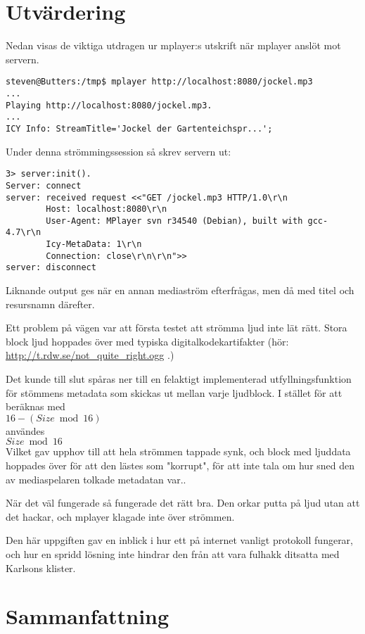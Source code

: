 \documentclass[a4paper, 11pt]{article}
\begin{document}
\section{Utvärdering}


Nedan visas de viktiga utdragen ur mplayer:s utskrift när mplayer anslöt mot servern.
\begin{verbatim}
steven@Butters:/tmp$ mplayer http://localhost:8080/jockel.mp3
...
Playing http://localhost:8080/jockel.mp3.
...
ICY Info: StreamTitle='Jockel der Gartenteichspr...';
\end{verbatim}

Under denna strömmingssession så skrev servern ut:
\begin{verbatim}
3> server:init().
Server: connect
server: received request <<"GET /jockel.mp3 HTTP/1.0\r\n
        Host: localhost:8080\r\n
        User-Agent: MPlayer svn r34540 (Debian), built with gcc-4.7\r\n
        Icy-MetaData: 1\r\n
        Connection: close\r\n\r\n">>
server: disconnect
\end{verbatim}

Liknande output ges när en annan mediaström efterfrågas, men då med titel och resursnamn därefter. 

Ett problem på vägen var att första testet att strömma ljud inte lät rätt. Stora block ljud hoppades över med typiska digitalkodekartifakter (hör: \url{http://t.rdw.se/not_quite_right.ogg} .)

Det kunde till slut spåras ner till en felaktigt implementerad utfyllningsfunktion för stömmens metadata som skickas ut mellan varje ljudblock. I stället för att beräknas med\\
$16 - (Size \bmod{16})$\\
användes \\
$Size \bmod{16}$\\
Vilket gav upphov till att hela strömmen tappade synk, och block med ljuddata hoppades över för att den lästes som "korrupt", för att inte tala om
hur sned den av mediaspelaren tolkade metadatan var..

När det väl fungerade så fungerade det rätt bra. Den orkar putta på ljud utan att det hackar, och mplayer klagade inte över strömmen. 

Den här uppgiften gav en inblick i hur ett på internet vanligt protokoll fungerar, och hur en spridd lösning inte hindrar den från att vara
fulhakk ditsatta med Karlsons klister.



\section{Sammanfattning}
\end{document}
